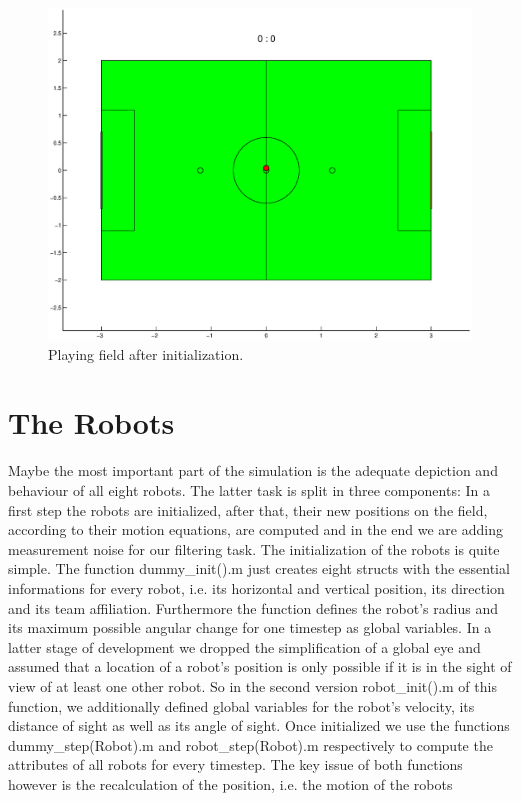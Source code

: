 \begin{figure}[htbp]
	\centering
    	\includegraphics[width=12cm]{./2_Simulation/playing_field}
  	\caption{Playing field after initialization.}
  	\label{KFchart}
\end{figure}


\section{The Robots}

Maybe the most important part of the simulation is the adequate depiction and behaviour of all eight robots. The latter task is split in three components: In a first step the robots are initialized, after that, their new positions on the field, according to their motion equations, are computed and in the end we are adding measurement noise for our filtering task. The initialization of the robots is quite simple. The function {\selectfont dummy\_init().m} just creates eight structs with the essential informations for every robot, i.e. its horizontal and vertical position, its direction and its team affiliation. Furthermore the function defines the robot's radius and its maximum possible angular change for one timestep as global variables. In a latter stage of development we dropped the simplification of a global eye and assumed that a location of a robot's position is only possible if it is in the sight of view of at least one other robot. So in the second version {\selectfont robot\_init().m} of this function, we additionally defined global variables for the robot's velocity, its distance of sight as well as its angle of sight. Once initialized we use the functions {\selectfont dummy\_step(Robot).m} and {\selectfont robot\_step(Robot).m} respectively to compute the attributes of all robots for every timestep. The key issue of both functions however is the recalculation of the position, i.e. the motion of the robots

